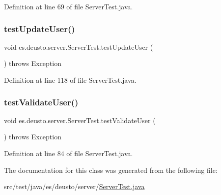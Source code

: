 Definition at line 69 of file Server\+Test.\+java.

\mbox{\label{classes_1_1deusto_1_1server_1_1_server_test_ad64ead953df265e40d07bdc0ab11137c}} 
\subsubsection{\texorpdfstring{test\+Update\+User()}{testUpdateUser()}}
{\footnotesize\ttfamily void es.\+deusto.\+server.\+Server\+Test.\+test\+Update\+User (\begin{DoxyParamCaption}{ }\end{DoxyParamCaption}) throws Exception}



Definition at line 118 of file Server\+Test.\+java.

\mbox{\label{classes_1_1deusto_1_1server_1_1_server_test_af493f29fde42af9e7d4c065f49bf8502}} 
\subsubsection{\texorpdfstring{test\+Validate\+User()}{testValidateUser()}}
{\footnotesize\ttfamily void es.\+deusto.\+server.\+Server\+Test.\+test\+Validate\+User (\begin{DoxyParamCaption}{ }\end{DoxyParamCaption}) throws Exception}



Definition at line 84 of file Server\+Test.\+java.



The documentation for this class was generated from the following file\+:\begin{DoxyCompactItemize}
\item 
src/test/java/es/deusto/server/\hyperlink{_server_test_8java}{Server\+Test.\+java}\end{DoxyCompactItemize}
